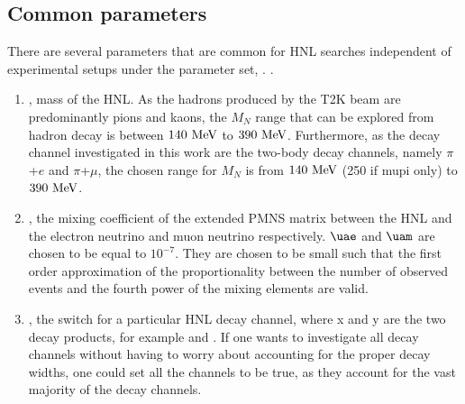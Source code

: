     \subsection{Common parameters}
    There are several parameters that are common for HNL searches independent of experimental setups under the parameter set, . .
    \begin{enumerate}
        \item {}, mass of the HNL.
            As the hadrons produced by the T2K beam are predominantly pions and kaons, the $M_{N}$ range that can be explored from hadron decay is between $140~\textrm{MeV}$ to $390~\textrm{MeV}$. 
            Furthermore, as the decay channel investigated in this work are the two-body decay channels, namely $\pi$+$e$ and $\pi$+$\mu$, the chosen range for $M_{N}$ is from $140~\textrm{MeV}$ (250 if mupi only) to $390~\textrm{MeV}$.
        \item {}, the mixing coefficient of the extended PMNS matrix between the HNL and the electron neutrino and muon neutrino respectively.
            $\uae$ and $\uam$ are chosen to be equal to $10^{-7}$. 
            They are chosen to be small such that the first order approximation of the proportionality between the number of observed events and the fourth power of the mixing elements are valid.
        \item {}, the switch for a particular HNL decay channel, where x and y are the two decay products, for example  and .
            If one wants to investigate all decay channels without having to worry about accounting for the proper decay widths, one could set all the channels to be true, as they account for the vast majority of the decay channels.
    \end{enumerate}

